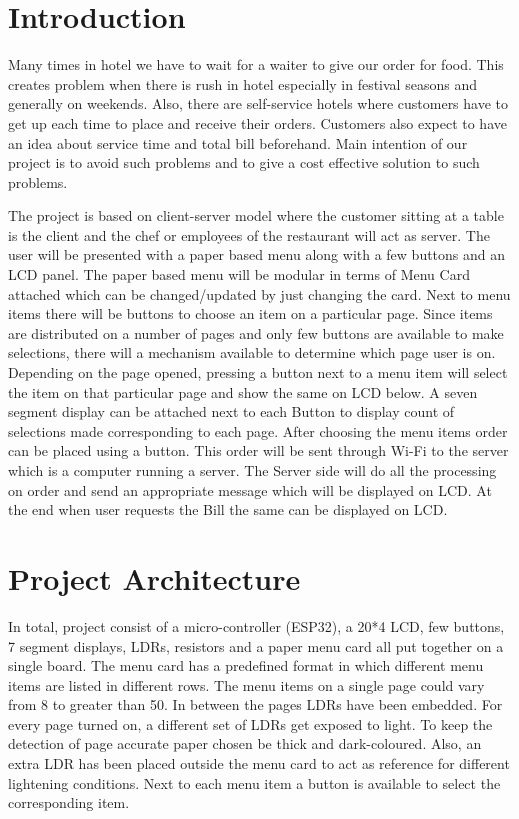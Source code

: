 \documentclass[12pt,a4paper]{article}
\begin{document}
	\section{Introduction}
	\begin{info}Many times in hotel we have to wait for a waiter to give our order for food. This creates
	problem when there is rush in hotel especially in festival seasons and generally on
	weekends. Also, there are self-service hotels where customers have to get up each
	time to place and receive their orders. Customers also expect to have an idea about
	service time and total bill beforehand. Main intention of our project is to avoid such
	problems and to give a cost effective solution to such problems.
	\end{info}	
	\begin{info}
	The project is based on client-server model where the customer sitting at a table is the
	client and the chef or employees of the restaurant will act as server. The user will be
	presented with a paper based menu along with a few buttons and an LCD panel. The
	paper based menu will be modular in terms of Menu Card attached which can be
	changed/updated by just changing the card. Next to menu items there will be buttons
	to choose an item on a particular page. Since items are distributed on a number of
	pages and only few buttons are available to make selections, there will a mechanism
	available to determine which page user is on. Depending on the page opened,
	pressing a button next to a menu item will select the item on that particular page and
	show the same on LCD below. A seven segment display can be attached next to each
	Button to display count of selections made corresponding to each page. After
	choosing the menu items order can be placed using a button. This order will be sent
	through Wi-Fi to the server which is a computer running a server. The Server side will
	do all the processing on order and send an appropriate message which will be
	displayed on LCD. At the end when user requests the Bill the same can be displayed
	on LCD.
	\end{info}
		
		\section{Project Architecture}
		In total, project consist of a micro-controller (ESP32), a 20*4 LCD, few buttons, 7 segment displays, LDRs, resistors and a paper menu card all put together on a single board. The menu card has a predefined format in which different menu items are listed in different rows. The menu items on a single page could vary from 8 to greater than 50. In between the pages LDRs have been embedded. For every page turned on, a different set of LDRs get exposed to light. To keep the detection of page accurate paper chosen be thick and dark-coloured. Also, an extra LDR has been placed outside the menu card to act as reference for different lightening conditions. Next to each menu item a button is available to select the corresponding item. 
		
\end{document}
